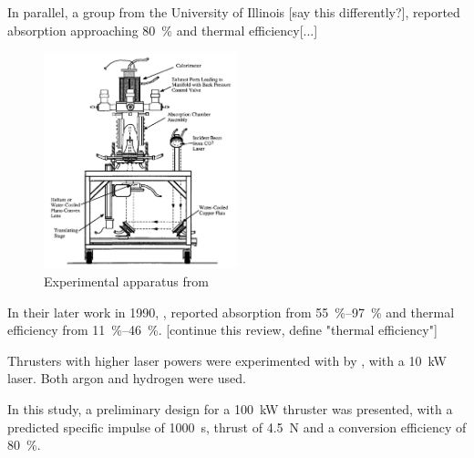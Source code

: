         In parallel, a group from the University of Illinois [say this differently?], reported absorption approaching \qty{80}{\%} and thermal efficiency[...]

        \begin{figure}[!ht]
            \centering
            \includegraphics[width=0.5\textwidth]{assets/2 background/Illinois (Krier) Apparatus.png}
            \caption{Experimental apparatus from \textcite{zerkleLasersustainedArgonPlasmas1990}}
            \label{fig:Krier apparatus}
        \end{figure}

        In their later work in 1990, \textcite{zerkleLasersustainedArgonPlasmas1990}, reported absorption from \qtyrange{55}{97}{\%} and thermal efficiency from \qtyrange{11}{46}{\%}. [continue this review, define "thermal efficiency"]

        Thrusters with higher laser powers were experimented with by \textcite{blackLaserPropulsion10kW1995}, with a \qty{10}{kW}  laser. Both argon and hydrogen were used.

        In this study, a preliminary design for a \qty{100}{kW} thruster was presented, with a predicted specific impulse of \qty{1000}{s}, thrust of \qty{4.5}{N} and a conversion efficiency of \qty{80}{\%}.



